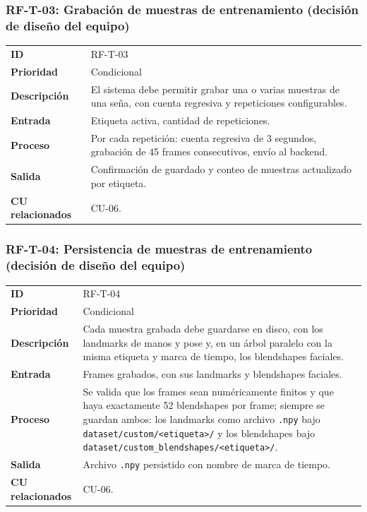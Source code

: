 \subsubsection{RF-T-03: Grabación de muestras de entrenamiento (decisión de diseño del equipo)}
\begin{table}[H]
\centering
\begin{tabularx}{\textwidth}{l X}
\toprule
\textbf{ID} & RF-T-03 \\
\textbf{Prioridad} & Condicional \\
\textbf{Descripción} & El sistema debe permitir grabar una o varias muestras de una seña, con cuenta regresiva y repeticiones configurables. \\
\textbf{Entrada} & Etiqueta activa, cantidad de repeticiones. \\
\textbf{Proceso} & Por cada repetición: cuenta regresiva de 3 segundos, grabación de 45 frames consecutivos, envío al backend. \\
\textbf{Salida} & Confirmación de guardado y conteo de muestras actualizado por etiqueta. \\
\textbf{CU relacionados} & CU-06. \\
\bottomrule
\end{tabularx}
\end{table}

\subsubsection{RF-T-04: Persistencia de muestras de entrenamiento (decisión de diseño del equipo)}
\begin{table}[H]
\centering
\begin{tabularx}{\textwidth}{l X}
\toprule
\textbf{ID} & RF-T-04 \\
\textbf{Prioridad} & Condicional \\
\textbf{Descripción} & Cada muestra grabada debe guardarse en disco, con los landmarks de manos y pose y, en un árbol paralelo con la misma etiqueta y marca de tiempo, los blendshapes faciales. \\
\textbf{Entrada} & Frames grabados, con sus landmarks y blendshapes faciales. \\
\textbf{Proceso} & Se valida que los frames sean numéricamente finitos y que haya exactamente 52 blendshapes por frame; siempre se guardan ambos: los landmarks como archivo \texttt{.npy} bajo \texttt{dataset/custom/<etiqueta>/} y los blendshapes bajo \texttt{dataset/custom\_blendshapes/<etiqueta>/}. \\
\textbf{Salida} & Archivo \texttt{.npy} persistido con nombre de marca de tiempo. \\
\textbf{CU relacionados} & CU-06. \\
\bottomrule
\end{tabularx}
\end{table}

